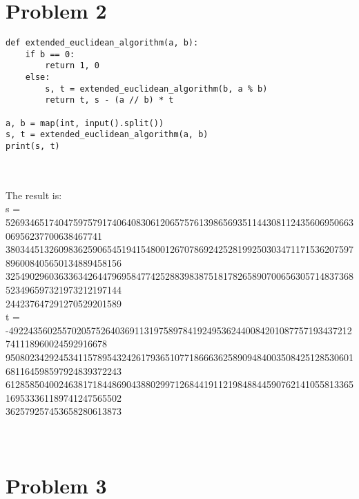 \documentclass{article}
\begin{document}
\section{Problem 2}
\begin{lstlisting}
def extended_euclidean_algorithm(a, b):
    if b == 0:
        return 1, 0
    else:
        s, t = extended_euclidean_algorithm(b, a % b)
        return t, s - (a // b) * t

a, b = map(int, input().split())
s, t = extended_euclidean_algorithm(a, b)
print(s, t)
\end{lstlisting}
\\ \hspace*{\fill} \\
The result is:\\
s = 52693465174047597579174064083061206575761398656935114430811243560695066306956237700638467741\\380344513260983625906545194154800126707869242528199250303471171536207597896008405650134889458156\\325490296036336342644796958477425288398387518178265890700656305714837368523496597321973212197144\\244237647291270529201589\\
t = -49224356025570205752640369113197589784192495362440084201087757193437212741118960024592916678\\950802342924534115789543242617936510771866636258909484003508425128530601681164598597924839372243\\612858504002463817184486904388029971268441911219848844590762141055813365169533361189741247565502\\362579257453658280613873\\
\\ \hspace*{\fill} \\
\newpage
\section{Problem 3}
\end{document}
